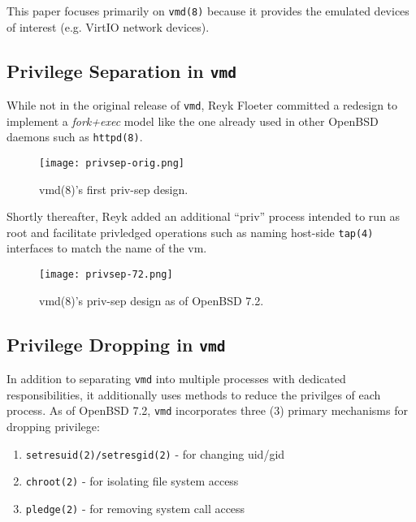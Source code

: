 \documentclass[conference]{IEEEtran}
\begin{document}
This paper focuses primarily on \texttt{vmd(8)} because it provides
the emulated devices of interest (e.g. VirtIO network devices).

\vspace{3mm}
\subsection{Privilege Separation in \texttt{vmd}}
While not in the original release of \texttt{vmd}, Reyk Floeter
committed \cite{b6} a redesign to implement a \emph{fork+exec} model
like the one already used in other OpenBSD daemons such as
\texttt{httpd(8)}.

\vspace{2mm}
\begin{figure}
  \texttt{[image: privsep-orig.png]}
  \caption{vmd(8)'s first priv-sep design.}
\end{figure}
\vspace{2mm}

Shortly thereafter, Reyk added \cite{b7} an additional ``priv''
process intended to run as root and facilitate privledged operations
such as naming host-side \texttt{tap(4)} interfaces to match the name
of the vm.

\vspace{2mm}
\begin{figure}
  \texttt{[image: privsep-72.png]}
  \caption{vmd(8)'s priv-sep design as of OpenBSD 7.2.}
\end{figure}
\vspace{2mm}


\vspace{3mm}
\subsection{Privilege Dropping in \texttt{vmd}}
In addition to separating \texttt{vmd} into multiple processes with
dedicated responsibilities, it additionally uses methods to reduce the
privilges of each process. As of OpenBSD 7.2, \texttt{vmd}
incorporates three (3) primary mechanisms for dropping privilege:

\vspace{2mm}
\begin{enumerate}
\item \texttt{setresuid(2)/setresgid(2)} - for changing uid/gid
\item \texttt{chroot(2)} - for isolating file system access
\item \texttt{pledge(2)} - for removing system call access
\end{enumerate}
\vspace{2mm}
\end{document}
